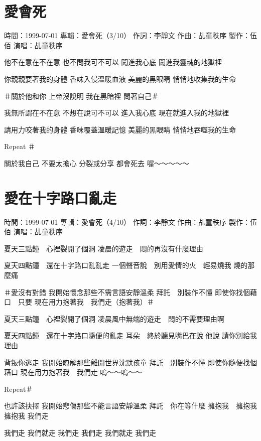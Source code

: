 \documentclass[UTF8,a4paper,oneside,twocolumn,12pt]{ctexbook}
\newcommand{\infopair}[2]{\textbullet #1：#2}
\newcommand{\zc}[1][伍佰]{\infopair{作詞}{#1}}
\newcommand{\zq}[1][伍佰]{\infopair{作曲}{#1}}
\newcommand{\zj}[1]{\infopair{專輯}{#1}}
\newcommand{\zz}[1]{\infopair{製作}{#1}}
\newcommand{\sj}[1]{\infopair{時間}{#1}}
\newenvironment{info}{\begin{flushleft}\kaishu
	}
	{\end{flushleft}\normalsize\yahei\par}
\newenvironment{lyric}{
	}
{}
\begin{document}
\section{愛會死}
\begin{info}
	\sj{1999-07-01}
	\zj{愛會死（3/10）}
	\zc[李靜文]
	\zq[乩童秩序]
	\zz{伍佰}
	\infopair{演唱}{乩童秩序}
\end{info}
\begin{lyric}
	他不在意在不在意
	也不問我可不可以
	闖進我心底
	闖進我靈魂的地獄裡

	你親親要著我的身體
	香味入侵溫暖血液
	美麗的黑眼睛
	悄悄地收集我的生命

	＃關於他和你
	上帝沒說明
	我在黑暗裡
	問著自己＃

	我無所謂在不在意
	不想在說可不可以
	進入我心底
	現在就進入我的地獄裡

	請用力咬著我的身體
	香味覆蓋溫暖記憶
	美麗的黑眼睛
	悄悄地吞噬我的生命

	Repeat ＃

	關於我自己
	不要太擔心
	分裂或分享
	都會死去
	喔～～～～～
\end{lyric}

\section{愛在十字路口亂走}
\begin{info}
	\sj{1999-07-01}
	\zj{愛會死（4/10）}
	\zc[李靜文]
	\zq[乩童秩序]
	\zz{伍佰}
	\infopair{演唱}{乩童秩序}
\end{info}
\begin{lyric}
	夏天三點鐘　心裡裂開了個洞
	凌晨的遊走　悶的再沒有什麼理由

	夏天四點鐘　還在十字路口亂亂走
	一個聲音說　別用愛情的火　輕易燒我
	燒的那麼痛

	＃愛沒有對錯
	我開始懷念那些不需言語安靜溫柔
	拜託　別裝作不懂
	即使你找個藉口　只要
	現在用力抱著我　我們走（抱著我）＃

	夏天三點鐘　心裡裂開了個洞
	凌晨風中無端的遊走　悶的不需要理由啊

	夏天四點鐘　還在十字路口隨便的亂走
	耳朵　終於聽見嘴巴在說
	他說  請你別給我理由

	背叛你逃走
	我開始瞭解那些離開世界沈默孩童
	拜託　別裝作不懂
	即使你隨便找個藉口
	現在用力抱著我　我們走
	嗚～～嗚～～

	Repeat＃

	也許該抉擇
	我開始悲傷那些不能言語安靜溫柔
	拜託　你在等什麼
	擁抱我　擁抱我　擁抱我
	我們走

	我們走  我們就走  我們走
	我們走  我們就走  我們走
\end{lyric}
\end{document}
